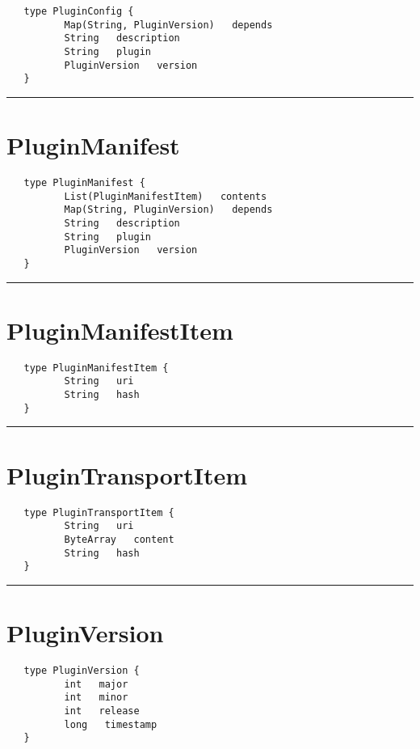 \begin{Verbatim}
   type PluginConfig {
          Map(String, PluginVersion)   depends
          String   description
          String   plugin
          PluginVersion   version
   }
\end{Verbatim}

\rule{12cm}{2pt}
\section{PluginManifest}
\label{type:PluginManifest}

\begin{Verbatim}
   type PluginManifest {
          List(PluginManifestItem)   contents
          Map(String, PluginVersion)   depends
          String   description
          String   plugin
          PluginVersion   version
   }
\end{Verbatim}

\rule{12cm}{2pt}
\section{PluginManifestItem}
\label{type:PluginManifestItem}

\begin{Verbatim}
   type PluginManifestItem {
          String   uri
          String   hash
   }
\end{Verbatim}

\rule{12cm}{2pt}
\section{PluginTransportItem}
\label{type:PluginTransportItem}

\begin{Verbatim}
   type PluginTransportItem {
          String   uri
          ByteArray   content
          String   hash
   }
\end{Verbatim}

\rule{12cm}{2pt}
\section{PluginVersion}
\label{type:PluginVersion}

\begin{Verbatim}
   type PluginVersion {
          int   major
          int   minor
          int   release
          long   timestamp
   }
\end{Verbatim}

